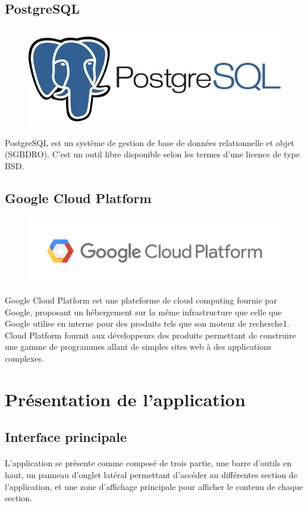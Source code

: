 \documentclass[]{report}
\begin{document}
		\subsection{PostgreSQL}
			\paragraph{}
			\begin{figure}[H]
				\centering
				\includegraphics[width=0.25\linewidth]{images/postgresql.jpg}
			\end{figure}
			PostgreSQL est un système de gestion de base de données relationnelle et objet (SGBDRO). C'est un outil libre disponible selon les termes d'une licence de type BSD.
		
		\subsection{Google Cloud Platform}
			\paragraph{}
			\begin{figure}[H]
				\centering
				\includegraphics[width=0.35\linewidth]{images/gcp.png}
			\end{figure}
		Google Cloud Platform est une plateforme de cloud computing fournie par Google, proposant un hébergement sur la même infrastructure que celle que Google utilise en interne pour des produits tels que son moteur de recherche1. Cloud Platform fournit aux développeurs des produits permettant de construire une gamme de programmes allant de simples sites web à des applications complexes.
	
	\section{Présentation de l'application}
		\subsection{Interface principale}
			\paragraph{}
			L'application se présente comme composé de trois partie, une barre d'outils en haut, un panneau d'onglet latéral permettant d'accéder au différentes section de l'application, et une zone d'affichage principale pour afficher le contenu de chaque section. 
\end{document}
